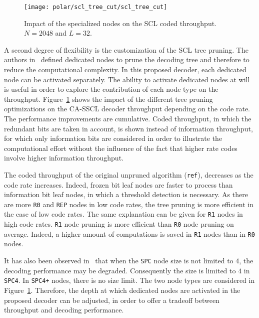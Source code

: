 \begin{figure}
  \centering
  \texttt{[image: polar/scl\_tree\_cut/scl\_tree\_cut]}
  \caption{Impact of the specialized nodes on the SCL coded throughput.
    $N=2048$ and $L=32$.}
  \label{plot:polar_scl_tree_cut}
\end{figure}

A second degree of flexibility is the customization of the SCL tree pruning. The
authors in~\cite{Alamdar-Yazdi2011,Sarkis2016} defined dedicated nodes to prune
the decoding tree and therefore to reduce the computational complexity. In this
proposed decoder, each dedicated node can be activated separately. The ability
to activate dedicated nodes at will is useful in order to explore the
contribution of each node type on the throughput.
Figure~\ref{plot:polar_scl_tree_cut} shows the impact of the different tree
pruning optimizations on the CA-SSCL decoder throughput depending on the code
rate. The performance improvements are cumulative. Coded throughput, in which
the redundant bits are taken in account, is shown instead of information
throughput, for which only information bits are considered in order to
illustrate the computational effort without the influence of the fact that
higher rate codes involve higher information throughput.

The coded throughput of the original unpruned algorithm (\texttt{ref}),
decreases as the code rate increases. Indeed, frozen bit leaf nodes are faster
to process than information bit leaf nodes, in which a threshold detection is
necessary. As there are more \texttt{R0} and \texttt{REP} nodes in low code
rates, the tree pruning is more efficient in the case of low code rates. The
same explanation can be given for \texttt{R1} nodes in high code rates.
\texttt{R1} node pruning is more efficient than \texttt{R0} node pruning on
average. Indeed, a higher amount of computations is saved in \texttt{R1} nodes
than in \texttt{R0} nodes.

It has also been observed in~\cite{Sarkis2016} that when the \texttt{SPC} node
size is not limited to $4$, the decoding performance may be degraded.
Consequently the size is limited to $4$ in \texttt{SPC4}. In \texttt{SPC4+}
nodes, there is no size limit. The two node types are considered in
Figure~\ref{plot:polar_scl_tree_cut}. Therefore, the depth at which dedicated
nodes are activated in the proposed decoder can be adjusted, in order to offer a
tradeoff between throughput and decoding performance.

